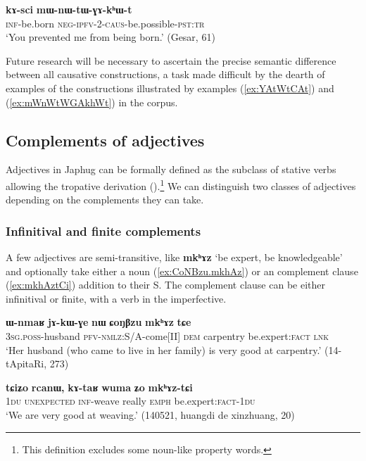 \documentclass[oneside,a4paper,11pt]{article}
\newcommand{\ipa}[1]{\textbf{\phon#1}} %
\newcommand{\jpg}[2]{\ipa{#1} `#2'} %
\newcommand{\refb}[1]{(\ref{#1})}
\begin{document}
\begin{exe}
\ex \label{ex:mWnWtWGAkhWt}
 \gll  	 	\ipa{kɤ-sci}  	\ipa{mɯ-nɯ-tɯ-ɣɤ-kʰɯ-t}  \\
\textsc{inf}-be.born \textsc{neg-ipfv-2-caus}-be.possible-\textsc{pst:tr} \\
 \glt   `You prevented me from being born.' (Gesar, 61)
   \end{exe}  

Future research will be necessary to ascertain the precise semantic difference between all causative constructions, a task made difficult by the dearth of examples of the constructions illustrated by examples \refb{ex:YAtWtCAt} and \refb{ex:mWnWtWGAkhWt} in the corpus.
 
\subsection{Complements of adjectives} \label{sec:adj}
Adjectives in Japhug can be formally defined as the subclass of stative verbs allowing the tropative derivation (\citealt{jacques13tropative}).\footnote{This definition excludes some noun-like property words.} We can distinguish two classes of adjectives depending on the complements they can take.


\subsubsection{Infinitival and finite complements} \label{sec:adj.infinitive}
A few adjectives are semi-transitive, like \jpg{mkʰɤz}{be expert, be knowledgeable} and optionally take either a noun (\ref{ex:CoNBzu.mkhAz}) or an complement clause (\ref{ex:mkhAztCi}) addition to their S. The complement clause can be either infinitival or finite, with a verb in the imperfective.

\begin{exe}
\ex \label{ex:CoNBzu.mkhAz}
\gll 
\ipa{ɯ-nmaʁ} 	\ipa{jɤ-kɯ-ɣe} 	\ipa{nɯ} 	\ipa{ɕoŋβzu} 	\ipa{mkʰɤz} 	\ipa{tɕe} \\
\textsc{3sg.poss}-husband \textsc{pfv-nmlz}:S/A-come[II] \textsc{dem} carpentry be.expert:\textsc{fact} \textsc{lnk} \\
\glt `Her husband (who came to live in her family) is very good at carpentry.' (14-tApitaRi, 273)
\end{exe}

\begin{exe}
\ex \label{ex:mkhAztCi}
\gll \ipa{tɕiʑo} 	\ipa{rcanɯ,} 	\ipa{kɤ-taʁ} 	\ipa{wuma} 	\ipa{ʑo} 	\ipa{mkʰɤz-tɕi} 	 \\
\textsc{1du}  \textsc{unexpected} \textsc{inf}-weave really \textsc{emph} be.expert:\textsc{fact}-\textsc{1du} \\
\glt `We are very good at weaving.' (140521, huangdi de xinzhuang, 20)
\end{exe}
\end{document}
